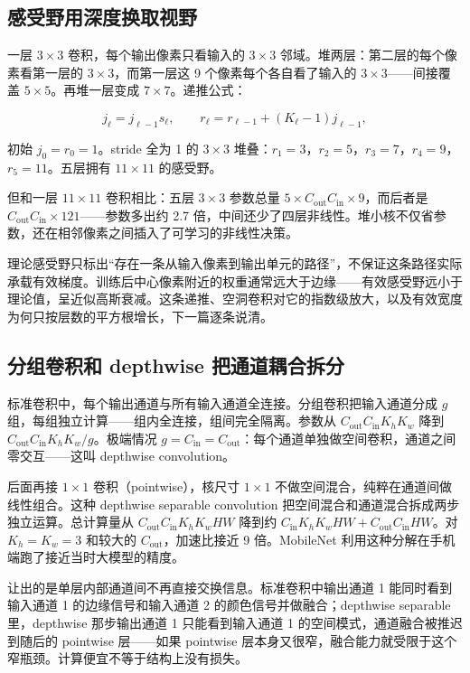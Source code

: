 \subsection{感受野用深度换取视野}

一层 \(3\times3\) 卷积，每个输出像素只看输入的 \(3\times3\) 邻域。堆两层：第二层的每个像素看第一层的 \(3\times3\)，而第一层这 9 个像素每个各自看了输入的 \(3\times3\)——间接覆盖 \(5\times5\)。再堆一层变成 \(7\times7\)。递推公式：

\[
j_\ell = j_{\ell-1}s_\ell,\qquad
r_\ell = r_{\ell-1} + (K_\ell-1)j_{\ell-1},
\]

初始 \(j_0=r_0=1\)。stride 全为 1 的 \(3\times3\) 堆叠：\(r_1=3\)，\(r_2=5\)，\(r_3=7\)，\(r_4=9\)，\(r_5=11\)。五层拥有 \(11\times11\) 的感受野。

但和一层 \(11\times11\) 卷积相比：五层 \(3\times3\) 参数总量 \(5\times C_{\mathrm{out}}C_{\mathrm{in}}\times 9\)，而后者是 \(C_{\mathrm{out}}C_{\mathrm{in}}\times 121\)——参数多出约 2.7 倍，中间还少了四层非线性。堆小核不仅省参数，还在相邻像素之间插入了可学习的非线性决策。

理论感受野只标出``存在一条从输入像素到输出单元的路径''，不保证这条路径实际承载有效梯度。训练后中心像素附近的权重通常远大于边缘——有效感受野远小于理论值，呈近似高斯衰减。这条递推、空洞卷积对它的指数级放大，以及有效宽度为何只按层数的平方根增长，下一篇逐条说清。

\subsection{分组卷积和 depthwise 把通道耦合拆分}

标准卷积中，每个输出通道与所有输入通道全连接。分组卷积把输入通道分成 \(g\) 组，每组独立计算——组内全连接，组间完全隔离。参数从 \(C_{\mathrm{out}}C_{\mathrm{in}}K_hK_w\) 降到 \(C_{\mathrm{out}}C_{\mathrm{in}}K_hK_w/g\)。极端情况 \(g=C_{\mathrm{in}}=C_{\mathrm{out}}\)：每个通道单独做空间卷积，通道之间零交互——这叫 depthwise convolution。

后面再接 \(1\times1\) 卷积（pointwise），核尺寸 \(1\times1\) 不做空间混合，纯粹在通道间做线性组合。这种 depthwise separable convolution 把空间混合和通道混合拆成两步独立运算。总计算量从 \(C_{\mathrm{out}}C_{\mathrm{in}}K_hK_wHW\) 降到约 \(C_{\mathrm{in}}K_hK_wHW + C_{\mathrm{out}}C_{\mathrm{in}}HW\)。对 \(K_h=K_w=3\) 和较大的 \(C_{\mathrm{out}}\)，加速比接近 9 倍。MobileNet 利用这种分解在手机端跑了接近当时大模型的精度。

让出的是单层内部通道间不再直接交换信息。标准卷积中输出通道 1 能同时看到输入通道 1 的边缘信号和输入通道 2 的颜色信号并做融合；depthwise separable 里，depthwise 那步输出通道 1 只能看到输入通道 1 的空间模式，通道融合被推迟到随后的 pointwise 层——如果 pointwise 层本身又很窄，融合能力就受限于这个窄瓶颈。计算便宜不等于结构上没有损失。

